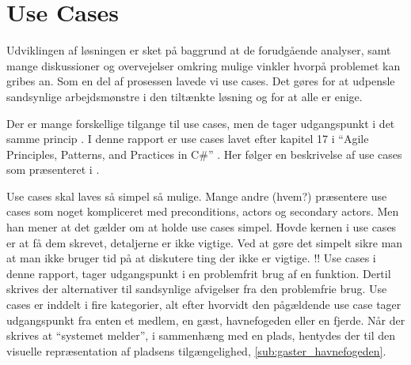 \section{Use Cases}

Udviklingen af løsningen er sket på baggrund at de forudgående analyser, samt mange diskussioner og overvejelser omkring mulige vinkler hvorpå problemet kan gribes an. Som en del af prosessen lavede vi use cases. Det gøres for at udpensle sandsynlige arbejdsmønstre i den tiltænkte løsning og for at alle er enige.

Der er mange forskellige tilgange til use cases, men de tager udgangspunkt i det samme princip . I denne rapport er use cases lavet efter kapitel 17 i \enquote{Agile Principles, Patterns, and Practices in C\#} \cite{martin2006agile}. Her følger en beskrivelse af use cases som præsenteret i \cite{martin2006agile}.

Use cases skal laves så simpel så mulige. Mange andre (hvem?) præsentere use cases som noget kompliceret med preconditions, actors og secondary actors. Men han mener at det gælder om at holde use cases simpel. Hovde kernen i use cases er at få dem skrevet, detaljerne er ikke vigtige. Ved at gøre det simpelt sikre man at man ikke bruger tid på at diskutere ting der ikke er vigtige. !!  Use cases i denne rapport, tager udgangspunkt i en problemfrit brug af en funktion. Dertil skrives der alternativer til sandsynlige afvigelser fra den problemfrie brug. Use cases er inddelt i fire kategorier, alt efter hvorvidt den pågældende use case tager udgangspunkt fra enten et medlem, en gæst, havnefogeden eller en fjerde. Når der skrives at \enquote{systemet melder}, i sammenhæng med en plads, hentydes der til den visuelle repræsentation af pladsens tilgængelighed, \cref{sub:gaster_havnefogeden}.

